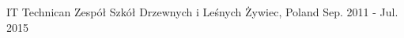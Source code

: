 

\begin{cventries}

  \cventry
    {IT Technican} %
    {Zespół Szkół Drzewnych i Leśnych} %
    {Żywiec, Poland} %
    {Sep. 2011 - Jul. 2015} %
    {}

\end{cventries}
